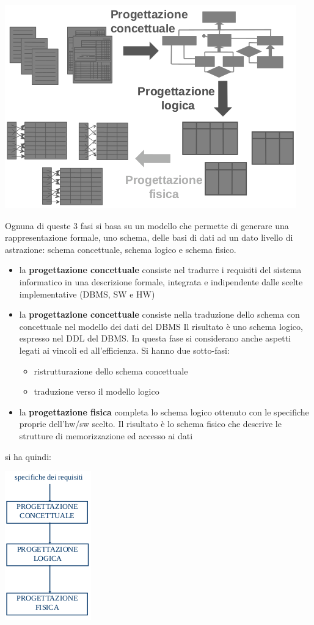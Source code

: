 \documentclass[a4paper,12pt, oneside]{book}
\begin{document}
\begin{center}
\includegraphics[scale=2.5]{img/bas4.png}
\end{center}
Ognuna di queste 3 fasi si basa su un modello che permette di generare una rappresentazione formale, uno schema, delle basi di dati ad un dato livello di astrazione: schema concettuale, schema logico e schema fisico. 
\begin{itemize}
\item la \textbf{progettazione concettuale} consiste nel tradurre i requisiti del sistema informatico in una descrizione formale, integrata e indipendente dalle scelte
implementative (DBMS, SW e HW)
\item la \textbf{progettazione concettuale} consiste nella traduzione dello schema con concettuale nel modello dei dati del DBMS Il risultato è uno schema logico, espresso nel DDL
del DBMS. In questa fase si considerano anche aspetti legati ai vincoli ed all'efficienza. Si hanno due sotto-fasi:
\begin{itemize}
\item ristrutturazione dello schema concettuale
\item traduzione verso il modello logico
\end{itemize}
\item la \textbf{progettazione fisica} completa lo
schema logico ottenuto con le
specifiche proprie dell'hw/sw scelto.
Il risultato è lo schema fisico che descrive le strutture
di memorizzazione ed accesso ai dati
\end{itemize}
si ha quindi:
\begin{center}
\includegraphics[scale=0.7]{img/bas5.png}
\end{center}
\end{document}
